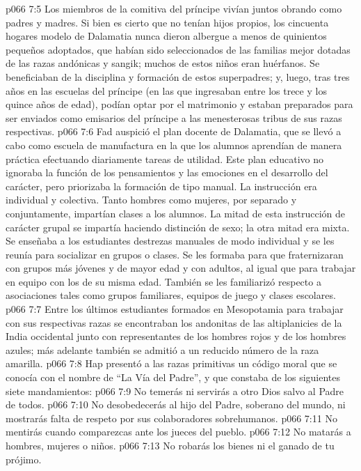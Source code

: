 \vs p066 7:5 Los miembros de la comitiva del príncipe vivían juntos obrando como padres y madres. Si bien es cierto que no tenían hijos propios, los cincuenta hogares modelo de Dalamatia nunca dieron albergue a menos de quinientos pequeños adoptados, que habían sido seleccionados de las familias mejor dotadas de las razas andónicas y sangik; muchos de estos niños eran huérfanos. Se beneficiaban de la disciplina y formación de estos superpadres; y, luego, tras tres años en las escuelas del príncipe (en las que ingresaban entre los trece y los quince años de edad), podían optar por el matrimonio y estaban preparados para ser enviados como emisarios del príncipe a las menesterosas tribus de sus razas respectivas.
\vs p066 7:6 \pc Fad auspició el plan docente de Dalamatia, que se llevó a cabo como escuela de manufactura en la que los alumnos aprendían de manera práctica efectuando diariamente tareas de utilidad. Este plan educativo no ignoraba la función de los pensamientos y las emociones en el desarrollo del carácter, pero priorizaba la formación de tipo manual. La instrucción era individual y colectiva. Tanto hombres como mujeres, por separado y conjuntamente, impartían clases a los alumnos. La mitad de esta instrucción de carácter grupal se impartía haciendo distinción de sexo; la otra mitad era mixta. Se enseñaba a los estudiantes destrezas manuales de modo individual y se les reunía para socializar en grupos o clases. Se les formaba para que fraternizaran con grupos más jóvenes y de mayor edad y con adultos, al igual que para trabajar en equipo con los de su misma edad. También se les familiarizó respecto a asociaciones tales como grupos familiares, equipos de juego y clases escolares.
\vs p066 7:7 Entre los últimos estudiantes formados en Mesopotamia para trabajar con sus respectivas razas se encontraban los andonitas de las altiplanicies de la India occidental junto con representantes de los hombres rojos y de los hombres azules; más adelante también se admitió a un reducido número de la raza amarilla.
\vs p066 7:8 \pc Hap presentó a las razas primitivas un código moral que se conocía con el nombre de “La Vía del Padre”, y que constaba de los siguientes siete mandamientos:
\vs p066 7:9 No temerás ni servirás a otro Dios salvo al Padre de todos.
\vs p066 7:10 No desobedecerás al hijo del Padre, soberano del mundo, ni mostrarás falta de respeto por sus colaboradores sobrehumanos.
\vs p066 7:11 No mentirás cuando comparezcas ante los jueces del pueblo.
\vs p066 7:12 No matarás a hombres, mujeres o niños.
\vs p066 7:13 No robarás los bienes ni el ganado de tu prójimo.
